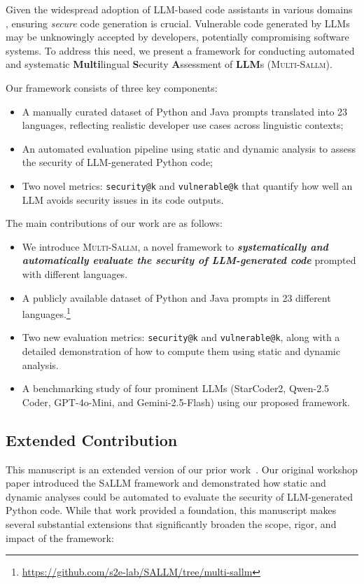 \documentclass[pdflatex,sn-mathphys-ay]{sn-jnl}
\newcommand{\sandoval}[0]{\textsc{Multi-Sallm}}
\begin{document}
Given the widespread adoption of LLM-based code assistants in various domains \cite{raihan2025large}, ensuring \textit{secure} code generation is crucial. Vulnerable code generated by LLMs may be unknowingly accepted by developers, potentially compromising software systems. To address this need, we present a framework for conducting automated and systematic \textbf{Multi}lingual \textbf{S}ecurity \textbf{A}ssessment of \textbf{LLM}s (\sandoval).

Our framework consists of three key components:
\begin{itemize}[]
    \item A manually curated dataset of Python and Java prompts translated into 23 languages, reflecting realistic developer use cases across linguistic contexts;
    \item An automated evaluation pipeline using static and dynamic analysis to assess the security of LLM-generated Python code;
     \item Two novel metrics: \texttt{security@k} and \texttt{vulnerable@k} that quantify how well an LLM avoids security issues in its code outputs.
\end{itemize}

The main contributions of our work are as follows:

\begin{itemize}
\item We introduce \sandoval, a novel framework to \textbf{\textit{systematically and automatically evaluate the security of LLM-generated code}} prompted with different languages.
\item A publicly available dataset of Python and Java prompts in 23 different languages.\footnote{\url{https://github.com/s2e-lab/SALLM/tree/multi-sallm}}
\item Two new evaluation metrics: \texttt{security@k} and \texttt{vulnerable@k}, along with a detailed demonstration of how to compute them using static and dynamic analysis.
\item A benchmarking study of four prominent LLMs (StarCoder2, Qwen-2.5 Coder, GPT-4o-Mini, and Gemini-2.5-Flash) using our proposed framework.
\end{itemize}

\subsection{Extended Contribution}

This manuscript is an extended version of our prior work~\cite{siddiq2024sallm}.
Our original workshop paper introduced the \textsc{SaLLM} framework and demonstrated how static and dynamic analyses could be automated to evaluate the security of LLM-generated Python code. While that work provided a foundation, this manuscript makes several substantial extensions that significantly broaden the scope, rigor, and impact of the framework:
\end{document}
